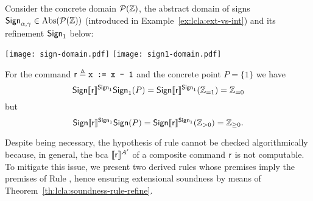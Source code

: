 \begin{example}\label{ex:lcla:bound-A'-not-A}
	Consider the concrete domain $\mathcal{P}(\mathbb{Z})$, the abstract domain of signs $\mathsf{Sign}_{\alpha, \gamma} \in \text{\normalfont Abs}(\mathcal{P}(\mathbb{Z}))$ (introduced in Example~\ref{ex:lcla:ext-vs-int}) and its refinement $\mathsf{Sign}_{1}$ below:

	\begin{center}
		\texttt{[image: sign-domain.pdf]}
		\qquad\qquad
		\texttt{[image: sign1-domain.pdf]}
	\end{center}

	For the command $\mathsf{r} \triangleq \texttt{x := x - 1}$ and the concrete point $P = \{ 1 \}$ we have
	\[
	\mathsf{Sign} \llbracket\mathsf{r}\rrbracket^{\mathsf{Sign}_{1}} \mathsf{Sign}_1(P) = \mathsf{Sign} \llbracket\mathsf{r}\rrbracket^{\mathsf{Sign}_{1}} (\mathbb{Z}_{= 1}) = \mathbb{Z}_{= 0}
	\]
	but
	\[
	\mathsf{Sign} \llbracket\mathsf{r}\rrbracket^{\mathsf{Sign}_1} \mathsf{Sign}(P) = \mathsf{Sign} \llbracket\mathsf{r}\rrbracket^{\mathsf{Sign}_1} (\mathbb{Z}_{> 0}) = \mathbb{Z}_{\ge 0} .
	\]
\end{example}

Despite being necessary, the hypothesis of rule  cannot be checked algorithmically because, in general, the bca $\llbracket\mathsf{r}\rrbracket^{A'}$ of a composite command $\mathsf{r}$ is not computable. To mitigate this issue, we present two derived rules whose premises imply the premises of Rule , hence ensuring extensional soundness by means of Theorem~\ref{th:lcla:soundness-rule-refine}.

